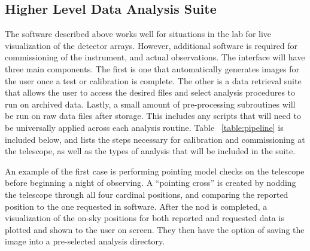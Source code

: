 \documentclass[manuscript]{aastex}
\begin{document}
\subsection{\textbf{Higher Level Data Analysis Suite}}

The software described above works well for situations in the lab for live visualization of the detector arrays. However, additional software is required for commissioning of the instrument, and actual observations. The interface will have three main components. The first is one that automatically generates images for the user once a test or calibration is complete. The other is a data retrieval suite that allows the user to access the desired files and select analysis procedures to run on archived data. Lastly, a small amount of pre-processing subroutines will be run on raw data files after storage. This includes any scripts that will need to be universally applied across each analysis routine. Table ~\ref{table:pipeline} is included below, and lists the steps necessary for calibration and commissioning at the telescope, as well as the types of analysis that will be included in the suite. 

An example of the first case is performing pointing model checks on the telescope before beginning a night of observing. A ``pointing cross'' is created by nodding the telescope through all four cardinal positions, and comparing the reported position to the one requested in software. After the nod is completed, a visualization of the on-sky positions for both reported and requested data is plotted and shown to the user on screen. They then have the option of saving the image into a pre-selected analysis directory. 
\end{document}
